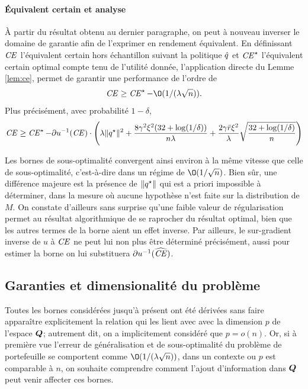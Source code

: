 \paragraph{Équivalent certain et analyse}

À partir du résultat obtenu au dernier paragraphe, on peut à nouveau inverser le domaine
de garantie afin de l'exprimer en rendement équivalent. En définissant $\operatorname{\mbox{\textit{CE}}}$ l'équivalent
certain hors échantillon suivant la politique $\hat q$ et $\operatorname{\mbox{\textit{CE}}}^\star$ l'équivalent certain
optimal compte tenu de l'utilité donnée, l'application directe du Lemme \ref{lem:ce},
permet de garantir une performance de l'ordre de
\begin{equation}
  \nCE \geq \nCE^\star - \O(1/(\lambda\sqrt{n})).
\end{equation}
Plus précisément, avec probabilité $1-\delta$, 
\begin{equation}
  \operatorname{\mbox{\textit{CE}}} \geq \operatorname{\mbox{\textit{CE}}}^\star - \partial u^{-1}(\operatorname{\mbox{\textit{CE}}}) \cdot \left(\lambda\|q^\star\|^2 + \frac{8\gamma^2\xi^2(32+\log(1/\delta))}{n\lambda} + \frac{2\gamma\bar r\xi^2}{\lambda}\sqrt{\frac{32+\log(1/\delta)}{n}}\right)
\end{equation}

Les bornes de sous-optimalité convergent ainsi environ à la même vitesse que celle de
sous-optimalité, c'est-à-dire dans un régime de $\O(1/\sqrt{n})$. Bien sûr, une différence
majeure est la présence de $\|q^\star\|$ qui est a priori impossible à déterminer, dans la
mesure où aucune hypothèse n'est faite sur la distribution de $M$. On constate d'ailleurs
sans surprise qu'une faible valeur de régularisation permet au résultat algorithmique de
se raprocher du résultat optimal, bien que les autres termes de la borne aient un effet
inverse. Par ailleurs, le sur-gradient inverse de $u$ à $\operatorname{\mbox{\textit{CE}}}$ ne peut lui non plus être
déterminé précisément, aussi pour estimer la borne on lui substituera $\partial u^{-1}(\operatorname{\widehat{\operatorname{\mbox{\textit{CE}}}}})$. 




\subsection{Garanties et dimensionalité du problème}
\label{b:dim}

Toutes les bornes considérées jusqu'à présent ont été dérivées sans faire apparaître
explicitement la relation qui les lient avec avec la dimension $p$ de l'espace $\bm Q$;
autrement dit, on a implicitement considéré que $p=o(n)$. Or, si à première vue l'erreur
de généralisation et de sous-optimalité du problème de portefeuille se comportent comme
$\O(1/(\lambda \sqrt{n}))$, dans un contexte ou $p$ est comparable à $n$, on souhaite comprendre
comment l'ajout d'information dans $\bm Q$ peut venir affecter ces bornes.



